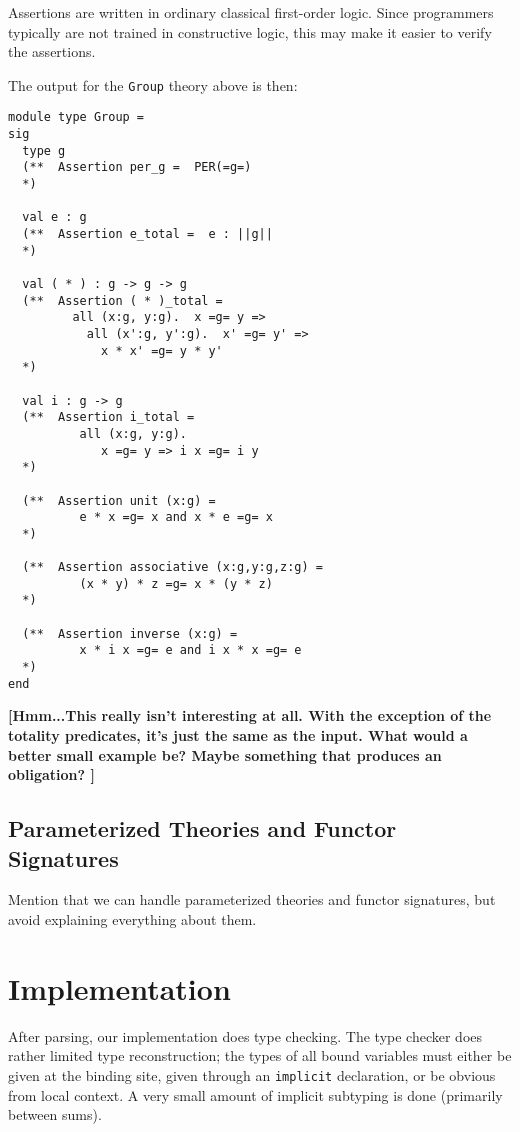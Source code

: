 \documentclass{article}
\newcommand{\comment}[1]{\textbf{[#1]}}
\begin{document}
Assertions are written in ordinary classical first-order logic. Since
programmers typically are not trained in constructive logic, this
may make it easier to verify the assertions.

The output for the \Verb|Group| theory above is then:
\begin{Verbatim}
module type Group = 
sig
  type g
  (**  Assertion per_g =  PER(=g=)
  *)
   
  val e : g
  (**  Assertion e_total =  e : ||g||
  *)
   
  val ( * ) : g -> g -> g
  (**  Assertion ( * )_total =
         all (x:g, y:g).  x =g= y =>
           all (x':g, y':g).  x' =g= y' => 
             x * x' =g= y * y'
  *)
   
  val i : g -> g
  (**  Assertion i_total =  
          all (x:g, y:g).  
             x =g= y => i x =g= i y
  *)
   
  (**  Assertion unit (x:g) =  
          e * x =g= x and x * e =g= x
  *)
   
  (**  Assertion associative (x:g,y:g,z:g) =  
          (x * y) * z =g= x * (y * z)
  *)
   
  (**  Assertion inverse (x:g) =  
          x * i x =g= e and i x * x =g= e
  *)
end
\end{Verbatim}
\comment{Hmm...This really isn't interesting at all.  With the
  exception of the totality predicates, it's just the same as the
  input.  What would a better small example be?  Maybe something
  that produces an obligation?
  }

\subsection{Parameterized Theories and Functor Signatures}
\label{sec:param-theor-funct}


Mention that we can handle parameterized theories and functor
signatures, but avoid explaining everything about them.

\section{Implementation}
\label{sec:impliementation}

After parsing, our implementation does type checking.  The type
checker does rather limited type reconstruction; the types of all
bound variables must either be given at the binding site, given
through an \Verb|implicit| declaration, or be obvious from local
context.  A very small amount of implicit subtyping is done (primarily
between sums).  
\end{document}
